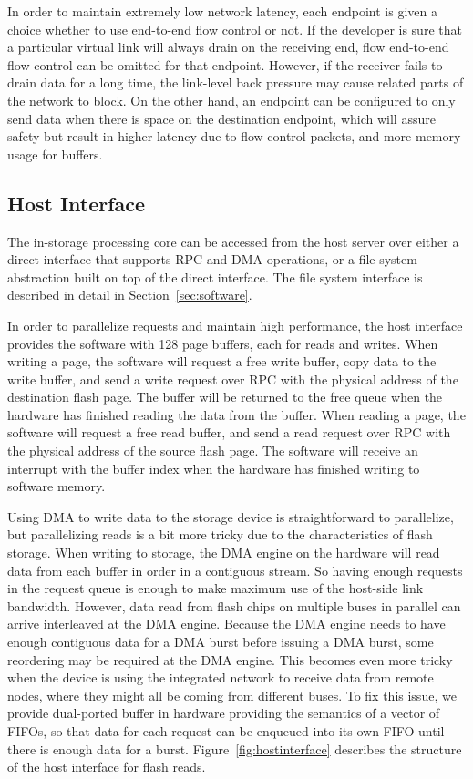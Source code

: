 In order to maintain extremely low network latency, each endpoint is given a
choice whether to use end-to-end flow control or not. If the developer is sure
that a particular virtual link will always drain on the receiving end, flow
end-to-end flow control can be omitted for that endpoint. However, if the
receiver fails to drain data for a long time, the link-level back pressure may
cause related parts of the network to block. On the other hand, an endpoint can
be configured to only send data when there is space on the destination endpoint,
which will assure safety but result in higher latency due to flow control
packets, and more memory usage for buffers.

\subsection{Host Interface}

The in-storage processing core can be accessed from the host server over either
a direct interface that supports RPC and DMA operations, or a file system
abstraction built on top of the direct interface. The file system interface is
described in detail in Section~\ref{sec:software}.

In order to parallelize requests and maintain high performance, the host
interface provides the software with 128 page buffers, each for reads and
writes. When writing a page, the software will request a free write buffer, copy
data to the write buffer, and send a write request over RPC with the
physical address of the destination flash page.
The buffer will be returned to the free queue when the
hardware has finished reading the data from the buffer. When reading a page, the
software will request a free read buffer, and send a read request over RPC with
the physical address of the source flash page. The software will receive an
interrupt with the buffer index when the hardware has finished writing to
software memory.

Using DMA to write data to the storage device is straightforward to parallelize,
but parallelizing reads is a bit more tricky due to the characteristics of flash
storage. When writing to storage, the DMA engine on the hardware will read data
from each buffer in order in a contiguous stream. So having enough requests in
the request queue is enough to make maximum use of the host-side link bandwidth.
However, data read from flash chips on multiple buses in parallel can arrive
interleaved at the DMA engine. Because the DMA engine needs to have enough
contiguous data for a DMA burst before issuing a DMA burst, some reordering may
be required at the DMA engine. This becomes even more tricky when the device is
using the integrated network to receive data from remote nodes, where they might
all be coming from different buses. To fix this issue, we provide dual-ported
buffer in hardware providing the semantics of a vector of FIFOs, so that data
for each request can be enqueued into its own FIFO until there is enough data
for a burst.
Figure~\ref{fig:hostinterface} describes the structure of the host interface for
flash reads.

